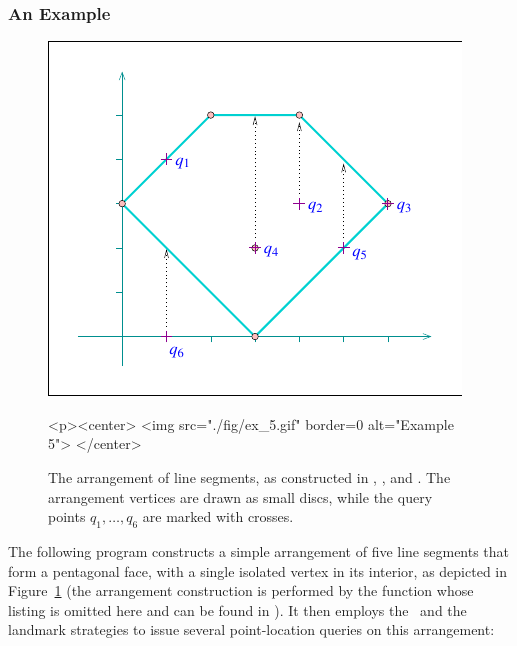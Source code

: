 \subsubsection{An Example}
\label{arr_sssec:pl_ex}
%
\begin{figure}[!htp]
\begin{ccTexOnly}
  \begin{center}
  \includegraphics{Arrangement_2/fig/ex_5}
  \end{center}
\end{ccTexOnly}
\begin{ccHtmlOnly}
  <p><center>
  <img src="./fig/ex_5.gif" border=0 alt="Example 5">
  </center>
\end{ccHtmlOnly}
\caption{The arrangement of line segments, as constructed in
, , and
. The
arrangement vertices are drawn as small discs, while the query
points $q_1, \ldots, q_6$ are marked with crosses.}
\label{arr_fig:ex_5}
\end{figure}

The following program constructs a simple arrangement of five line
segments that form a pentagonal face, with a single isolated
vertex in its interior, as depicted in Figure~\ref{arr_fig:ex_5}
(the arrangement construction is performed by the function
 whose listing is omitted here and
can be found in ).
It then employs the \naive\ and the landmark strategies to issue
several point-location queries on this arrangement:


